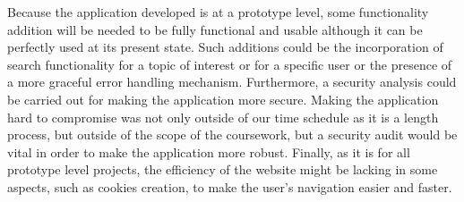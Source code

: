 \documentclass[12pt,a4paper,titlepage]{article}
\begin{document}
Because the application developed is at a prototype level, some functionality addition will be needed to be fully functional and usable although it can be perfectly used at its present state. Such additions could be the incorporation of search functionality for a topic of interest or for a specific user or the presence of a more graceful error handling mechanism. Furthermore, a security analysis could be carried out for making the application more secure. Making the application hard to compromise was not only outside of our time schedule as it is a length process, but outside of the scope of the coursework, but a security audit would be vital in order to make the application more robust. Finally, as it is for all prototype level projects, the efficiency of the website might be lacking in some aspects, such as cookies creation, to make the user's navigation easier and faster.
\end{document}
